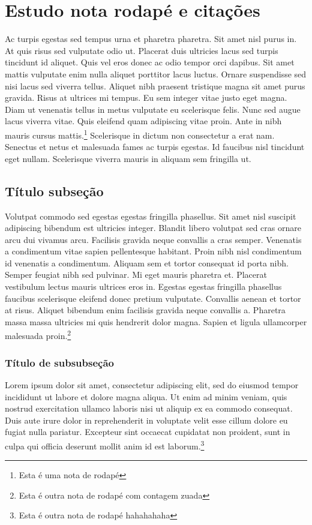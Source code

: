 \documentclass[12pt]{article}
\begin{document}
	\section{Estudo nota rodapé e citações}
		Ac turpis egestas sed tempus urna et pharetra pharetra. Sit amet nisl purus in. At quis risus sed vulputate odio ut. Placerat duis ultricies lacus sed turpis tincidunt id aliquet. Quis vel eros donec ac odio tempor orci dapibus. Sit amet mattis vulputate enim nulla aliquet porttitor lacus luctus. Ornare suspendisse sed nisi lacus sed viverra tellus. Aliquet nibh praesent tristique magna sit amet purus gravida. Risus at ultrices mi tempus. Eu sem integer vitae justo eget magna. Diam ut venenatis tellus in metus vulputate eu scelerisque felis. Nunc sed augue lacus viverra vitae. Quis eleifend quam adipiscing vitae proin. Ante in nibh mauris cursus mattis.\footnote{Esta é uma nota de rodapé} Scelerisque in dictum non consectetur a erat nam. Senectus et netus et malesuada fames ac turpis egestas. Id faucibus nisl tincidunt eget nullam. Scelerisque viverra mauris in aliquam sem fringilla ut.
	
		\subsection{Título subseção}
			Volutpat commodo sed egestas egestas fringilla phasellus. Sit amet nisl suscipit adipiscing bibendum est ultricies integer. Blandit libero volutpat sed cras ornare arcu dui vivamus arcu. Facilisis gravida neque convallis a cras semper. Venenatis a condimentum vitae sapien pellentesque habitant. Proin nibh nisl condimentum id venenatis a condimentum. Aliquam sem et tortor consequat id porta nibh. Semper feugiat nibh sed pulvinar. Mi eget mauris pharetra et. Placerat vestibulum lectus mauris ultrices eros in. Egestas egestas fringilla phasellus faucibus scelerisque eleifend donec pretium vulputate. Convallis aenean et tortor at risus. Aliquet bibendum enim facilisis gravida neque convallis a. Pharetra massa massa ultricies mi quis hendrerit dolor magna. Sapien et ligula ullamcorper malesuada proin.\footnote[516]{Esta é outra nota de rodapé com contagem zuada}
		
			\subsubsection{Título de subsubseção}
				Lorem ipsum dolor sit amet, consectetur adipiscing elit, sed do eiusmod tempor incididunt ut labore et dolore magna aliqua. Ut enim ad minim veniam, quis nostrud exercitation ullamco laboris nisi ut aliquip ex ea commodo consequat. Duis aute irure dolor in reprehenderit in voluptate velit esse cillum dolore eu fugiat nulla pariatur. Excepteur sint occaecat cupidatat non proident, sunt in culpa qui officia deserunt mollit anim id est laborum.\footnote{Esta é outra nota de rodapé hahahahaha}
			
\end{document}
